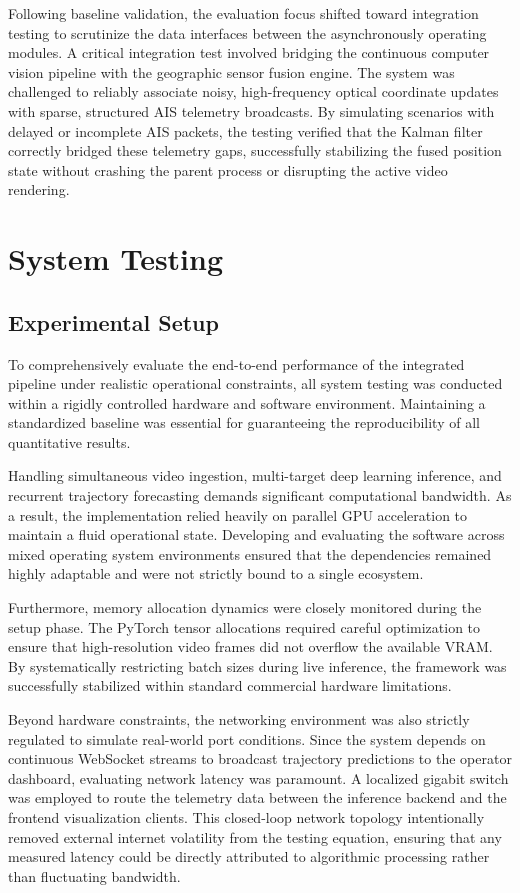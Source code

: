 Following baseline validation, the evaluation focus shifted toward integration testing to scrutinize the data interfaces between the asynchronously operating modules. A critical integration test involved bridging the continuous computer vision pipeline with the geographic sensor fusion engine. The system was challenged to reliably associate noisy, high-frequency optical coordinate updates with sparse, structured AIS telemetry broadcasts. By simulating scenarios with delayed or incomplete AIS packets, the testing verified that the Kalman filter correctly bridged these telemetry gaps, successfully stabilizing the fused position state without crashing the parent process or disrupting the active video rendering.

\section{System Testing}
\subsection{Experimental Setup}

To comprehensively evaluate the end-to-end performance of the integrated pipeline under realistic operational constraints, all system testing was conducted within a rigidly controlled hardware and software environment. Maintaining a standardized baseline was essential for guaranteeing the reproducibility of all quantitative results. 

Handling simultaneous video ingestion, multi-target deep learning inference, and recurrent trajectory forecasting demands significant computational bandwidth. As a result, the implementation relied heavily on parallel GPU acceleration to maintain a fluid operational state. Developing and evaluating the software across mixed operating system environments ensured that the dependencies remained highly adaptable and were not strictly bound to a single ecosystem. 

Furthermore, memory allocation dynamics were closely monitored during the setup phase. The PyTorch tensor allocations required careful optimization to ensure that high-resolution video frames did not overflow the available VRAM. By systematically restricting batch sizes during live inference, the framework was successfully stabilized within standard commercial hardware limitations.

Beyond hardware constraints, the networking environment was also strictly regulated to simulate real-world port conditions. Since the system depends on continuous WebSocket streams to broadcast trajectory predictions to the operator dashboard, evaluating network latency was paramount. A localized gigabit switch was employed to route the telemetry data between the inference backend and the frontend visualization clients. This closed-loop network topology intentionally removed external internet volatility from the testing equation, ensuring that any measured latency could be directly attributed to algorithmic processing rather than fluctuating bandwidth.

